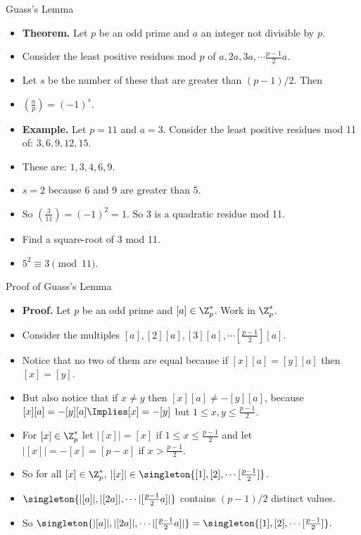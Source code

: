 \documentclass{beamer}
\begin{document}
\begin{frame}{Guass's Lemma}

\begin{itemize}
  \item \textbf{Theorem.}  Let $p$ be an odd prime and $a$ an integer not divisible by $p$.
  \item Consider the least positive residues mod $p$ of $a, 2a, 3a, \cdots \frac{p-1}{2} a$.
  \item Let $s$ be the number of these that are greater than $(p-1)/2$. Then
  \item $(\frac{a}{p}) = (-1)^s$.
  \item \textbf{Example.} Let $p=11$ and $a=3$. Consider the least positive residues mod 11 of:
  $3, 6, 9, 12, 15$.
  \item These are: $1, 3, 4, 6, 9$.
  \item $s=2$ because 6 and 9 are greater than 5.
  \item So  $(\frac{3}{11}) = (-1)^2 = 1$. So 3 is a quadratic residue mod 11.
  \item Find a square-root of 3 mod 11.
  \item $5^2 \equiv 3 \pmod {11}$.
\end{itemize}

\end{frame}

\begin{frame}{Proof of Guass's Lemma}

\begin{itemize}
  \item \textbf{Proof.} Let $p$ be an odd prime and $[a]\in\Z^*_p$. Work in $\Z^*_p$.
  \item Consider the multiples $[a],[2][a],[3][a],\cdots[\frac{p-1}{2}][a]$.
  \item Notice that no two of them are equal because if $[x][a]=[y][a]$ then $[x]=[y]$.
  \item But also notice that if $x\not=y$ then $[x][a] \not= -[y][a]$, because
  $[x][a] = -[y][a] \Implies [x]=-[y]$ but $1\leq x,y\leq \frac{p-1}{2}$.
  \item For $[x]\in \Z^*_p$ let $|[x]| = [x]$ if $1\leq x \leq \frac{p-1}{2}$ and
  let $|[x]| = -[x] = [p-x]$ if $x>\frac{p-1}{2}$.
  \item So for all $[x]\in\Z^*_p$, $|[x]|\in \singleton{[1],[2],\cdots [\frac{p-1}{2}]}$.
  \item $\singleton{|[a]|,|[2a]|,\cdots |[\frac{p-1}{2}a]|}$ contains $(p-1)/2$ distinct values.
  \item So $\singleton{|[a]|,|[2a]|,\cdots |[\frac{p-1}{2}a]|} = \singleton{[1],[2],\cdots [\frac{p-1}{2}]}.$
\end{itemize}

\end{frame}
\end{document}
